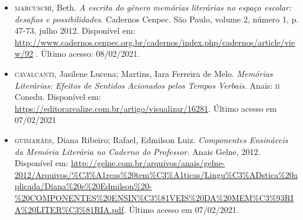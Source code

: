 \documentclass[11pt]{extarticle}
\begin{document}
\begin{itemize}
\item\textsc{marcuschi}, Beth. \emph{A escrita do gênero memórias literárias no espaço escolar: desafios e possibilidades}. Cadernos Cenpec. São Paulo, volume
2, número 1, p. 47-73, julho 2012. Disponível em:
\url{http://www.cadernos.cenpec.org.br/cadernos/index.php/cadernos/article/view/92}
. Último acesso: 08/02/2021.

\item\textsc{cavalcanti}, Jasilene Lucena; Martins, Iara Ferreira de Melo.
\emph{Memórias Literárias: Efeitos de Sentidos Acionados pelos Tempos
Verbais}. Anais: \textsc{ii} Conedu. Disponível em:
\url{https://editorarealize.com.br/artigo/visualizar/16281}.
Último acesso em 07/02/2021

\item\textsc{guimarães}, Diana Ribeiro; Rafael, Edmilson Luiz. \emph{Componentes
Ensináveis da Memória Literária no Caderno do Professor.} Anais Gelne,
2012. Disponível em:
\url{http://gelne.com.br/arquivos/anais/gelne-2012/Arquivos/\%C3\%A1reas\%20tem\%C3\%A1ticas/Lingu\%C3\%ADstica\%20aplicada/Diana\%20e\%20Edmilson\%20-\%20COMPONENTES\%20ENSIN\%C3\%81VEIS\%20DA\%20MEM\%C3\%93RIA\%20LITER\%C3\%81RIA.pdf}. Último acesso em 07/02/2021.
\end{itemize}
\end{document}
